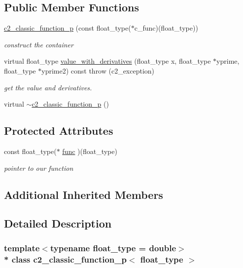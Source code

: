 \subsection*{Public Member Functions}
\begin{DoxyCompactItemize}
\item 
\hyperlink{classc2__classic__function__p_a8b2d09d67a8835902fd6c684d5b183b7}{c2\+\_\+classic\+\_\+function\+\_\+p} (const float\+\_\+type($\ast$c\+\_\+func)(float\+\_\+type))
\begin{DoxyCompactList}\small\item\em construct the container \end{DoxyCompactList}\item 
virtual float\+\_\+type \hyperlink{classc2__classic__function__p_abf7fc11b0396fc249eb3300ed39b3cc3}{value\+\_\+with\+\_\+derivatives} (float\+\_\+type x, float\+\_\+type $\ast$yprime, float\+\_\+type $\ast$yprime2) const   throw (c2\+\_\+exception)
\begin{DoxyCompactList}\small\item\em get the value and derivatives. \end{DoxyCompactList}\item 
virtual \hyperlink{classc2__classic__function__p_a8d60534649fe372b598ecdbd7f836e8f}{$\sim$c2\+\_\+classic\+\_\+function\+\_\+p} ()
\end{DoxyCompactItemize}
\subsection*{Protected Attributes}
\begin{DoxyCompactItemize}
\item 
const float\+\_\+type($\ast$ \hyperlink{classc2__classic__function__p_aecf8f1403a217fa1bae55a6367c88949}{func} )(float\+\_\+type)
\begin{DoxyCompactList}\small\item\em pointer to our function \end{DoxyCompactList}\end{DoxyCompactItemize}
\subsection*{Additional Inherited Members}


\subsection{Detailed Description}
\subsubsection*{template$<$typename float\+\_\+type = double$>$\\*
class c2\+\_\+classic\+\_\+function\+\_\+p$<$ float\+\_\+type $>$}

